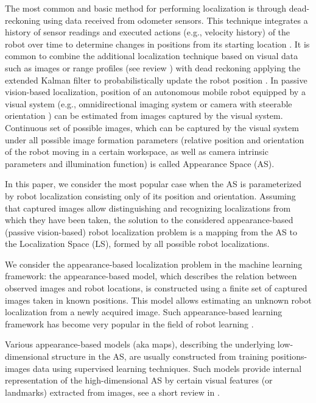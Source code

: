 \documentclass[conference]{IEEEtran} %
\begin{document}
The most common and basic method for performing localization is through dead-reckoning using data received from odometer sensors. This technique integrates a history of sensor readings and executed actions (e.g., velocity history) of the robot over time to determine changes in positions from its starting location \cite{bib1,bib2,bib3}. It is common to combine the additional localization technique based on visual data such as images or range profiles (see review \cite{bib4}) with dead reckoning applying the extended Kalman filter to probabilistically update the robot position \cite{bib5,bib6}. In passive vision-based localization, position of an autonomous mobile robot equipped by a visual system (e.g., omnidirectional imaging system \cite{bib7,bib8,bib9} or camera with steerable orientation \cite{bib10}) can be estimated from images captured by the visual system. Continuous set of possible images, which can be captured by the visual system under all possible image formation parameters (relative position and orientation of the robot moving in a certain workspace, as well as camera intrinsic parameters and illumination function) is called Appearance Space (AS).

In this paper, we consider the most popular case when the AS is parameterized by robot localization  consisting only of its position and orientation. Assuming that captured images allow distinguishing and recognizing localizations from which they have been taken, the solution to the considered appearance-based (passive vision-based) robot localization problem is a mapping from the AS to the Localization Space (LS), formed by all possible robot localizations.

We consider the appearance-based localization problem in the machine learning framework: the appearance-based model, which describes the relation between observed images and robot locations, is constructed using a finite set of captured images taken in known positions. This model allows estimating an unknown robot localization from a newly acquired image. Such appearance-based learning framework has become very popular in the field of robot learning \cite{bib11}.

Various appearance-based models (aka maps), describing the underlying low-dimensional structure in the AS, are usually constructed from training positions-images data using supervised learning techniques. Such models provide internal representation of the high-dimensional AS by certain visual features (or landmarks) extracted from images, see a short review in \cite{bib12}.
\end{document}
